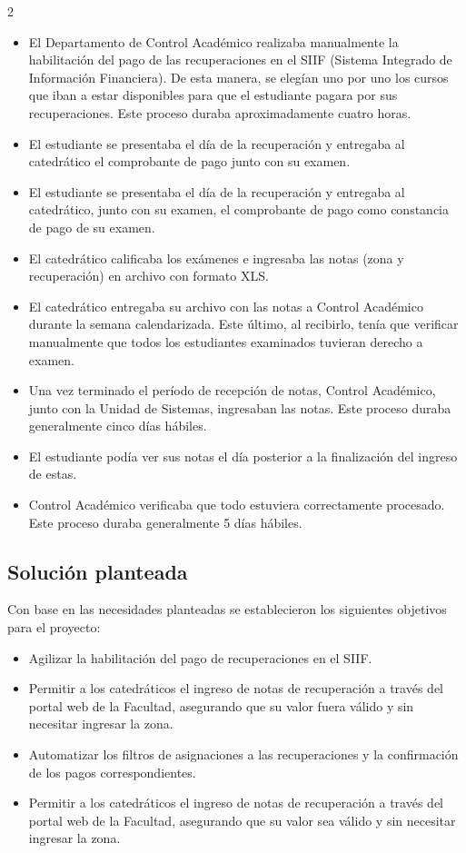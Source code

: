 \documentclass[11pt,spanish,Letterpaper,openany]{book}
\begin{document}
\begin {multicols}{2}
\begin{itemize}
\item
  El Departamento de Control Académico realizaba manualmente la habilitación del pago de las recuperaciones en el SIIF (Sistema Integrado de Información Financiera). De esta manera, se elegían uno por uno los cursos que iban a estar disponibles para que el estudiante pagara por sus recuperaciones. Este proceso duraba aproximadamente cuatro horas.
\item
  El estudiante se presentaba el día de la recuperación y entregaba al catedrático el comprobante de pago junto con su examen.
\item
  El estudiante se presentaba el día de la recuperación y entregaba al catedrático, junto con su examen, el comprobante de pago como constancia de pago de su examen.
\item
  El catedrático calificaba los exámenes e ingresaba las notas (zona y recuperación) en archivo con formato XLS.
\item
  El catedrático entregaba su archivo con las notas a Control Académico durante la semana calendarizada. Este último, al recibirlo, tenía que verificar manualmente que todos los estudiantes examinados tuvieran derecho a examen.
\item
  Una vez terminado el período de recepción de notas, Control Académico, junto con la Unidad de Sistemas, ingresaban las notas. Este proceso duraba generalmente cinco días hábiles.
\item
  El estudiante podía ver sus notas el día posterior a la finalización del ingreso de estas.
\item
  Control Académico verificaba que todo estuviera correctamente procesado. Este proceso duraba generalmente 5 días hábiles.
\end{itemize}

\hypertarget{solucion-planteada}{%
\subsection{Solución planteada}\label{solucion-planteada}}

Con base en las necesidades planteadas se establecieron los siguientes objetivos para el proyecto:

\begin{itemize}
\item
  Agilizar la habilitación del pago de recuperaciones en el SIIF.
\item
  Permitir a los catedráticos el ingreso de notas de recuperación a través del portal web de la Facultad, asegurando que su valor fuera válido y sin necesitar ingresar la zona.
\item
  Automatizar los filtros de asignaciones a las recuperaciones y la confirmación de los pagos correspondientes.
\item
  Permitir a los catedráticos el ingreso de notas de recuperación a través del portal web de la Facultad, asegurando que su valor sea válido y sin necesitar ingresar la zona.
\end{itemize}


\end{multicols}
\end{document}
